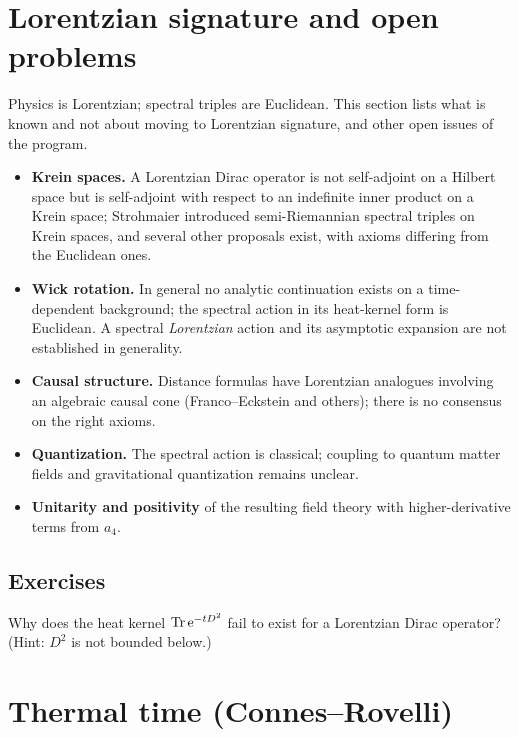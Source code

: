 \section{Lorentzian signature and open problems}\label{ch:lorentzian_nc}
\skippable

\begin{physmotiv}
Physics is Lorentzian; spectral triples are Euclidean. This section lists what is known and not about moving to Lorentzian signature, and other open issues of the program.
\end{physmotiv}

\begin{itemize}
\item \textbf{Krein spaces.} A Lorentzian Dirac operator is not self-adjoint on a Hilbert space but is self-adjoint with respect to an indefinite inner product on a Krein space; Strohmaier \cite{Strohmaier2006} introduced semi-Riemannian spectral triples on Krein spaces, and several other proposals exist, with axioms differing from the Euclidean ones.
\item \textbf{Wick rotation.} In general no analytic continuation exists on a time-dependent background; the spectral action in its heat-kernel form is Euclidean. A spectral \emph{Lorentzian} action and its asymptotic expansion are not established in generality.
\item \textbf{Causal structure.} Distance formulas have Lorentzian analogues involving an algebraic causal cone (Franco--Eckstein \cite{FrancoEckstein2013} and others); there is no consensus on the right axioms.
\item \textbf{Quantization.} The spectral action is classical; coupling to quantum matter fields and gravitational quantization remains unclear.
\item \textbf{Unitarity and positivity} of the resulting field theory with higher-derivative terms from $a_4$.
\end{itemize}

\subsection*{Exercises}
\begin{exercise}\label{ex:lorentzian_nc:1}
Why does the heat kernel $\operatorname{Tr}\mathrm{e}^{-tD^2}$ fail to exist for a Lorentzian Dirac operator? (Hint: $D^2$ is not bounded below.)
\end{exercise}

\section{Thermal time (Connes--Rovelli)}\label{ch:thermal_time}
\skippable


